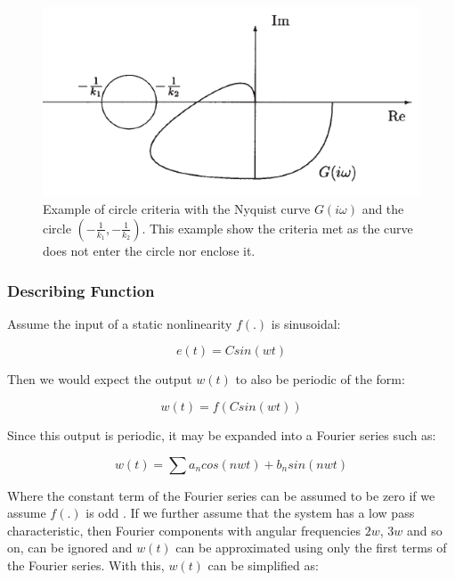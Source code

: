 \documentclass[a4paper, titlepage]{article}
\begin{document}
\begin{figure}[h!]
\center
\includegraphics[scale=1]{../figures/circleExample.png}
\caption{Example of circle criteria with the Nyquist curve $G(i\omega)$ and the circle $\left(-\frac{1}{k_1}, -\frac{1}{k_2}\right)$. This example show the criteria met as the curve does not enter the circle nor enclose it. \citep[~p.333]{glad00}}
\label{fig:cirEx}
\end{figure}



\subsubsection{Describing Function}
Assume the input of a static nonlinearity $f(.)$ is sinusoidal:

\begin{equation}
	e(t) = Csin(wt)
	\label{equ:input_e}
\end{equation}

Then we would expect the output $w(t)$ to also be periodic of the form:

\begin{equation}
	w(t) = f(Csin(wt))
\end{equation}

Since this output is periodic, it may be expanded into a Fourier series such as:

\begin{equation}
	w(t) = \sum{a_{n}cos(nwt)+b_{n}sin(nwt)}
\end{equation}

Where the constant term of the Fourier series can be assumed to be zero if we assume $f(.)$ is odd \citep[p. 358]{glad00}.  If we further assume that the system has a low pass characteristic, then Fourier components with angular frequencies $2w$, $3w$ and so on, can be ignored and $w(t)$ can be approximated using only the first terms of the Fourier series.  With this, $w(t)$ can be simplified as:
\end{document}
